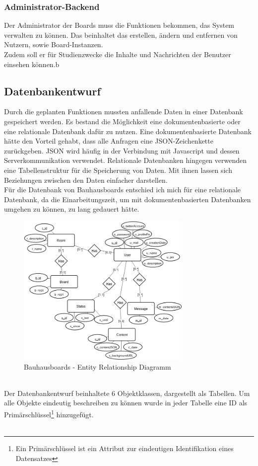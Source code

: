 \subsubsection{Administrator-Backend}\label{Administrator-Backend}
Der Administrator der Boards muss die Funktionen bekommen, das System verwalten zu können. Das beinhaltet das erstellen, ändern und entfernen von Nutzern, sowie Board-Instanzen.
\\
Zudem soll er für Studienzwecke die Inhalte und Nachrichten der Benutzer einsehen können.b

\subsection{Datenbankentwurf}\label{Datenbankentwurf}
Durch die geplanten Funktionen mussten anfallende Daten in einer Datenbank gespeichert werden.
Es bestand die Möglichkeit eine dokumentenbasierte oder eine relationale Datenbank dafür zu nutzen.
Eine dokumentenbasierte Datenbank hätte den Vorteil gehabt, dass alle Anfragen eine JSON-Zeichenkette zurückgeben. JSON wird häufig in der Verbindung mit Javascript und dessen Serverkommunikation verwendet.
Relationale Datenbanken hingegen verwenden eine Tabellenstruktur für die Speicherung von Daten. Mit ihnen lassen sich Beziehungen zwischen den Daten einfacher darstellen.
\\
Für die Datenbank von Bauhausboards entschied ich mich für eine relationale Datenbank, da die Einarbeitungszeit, um mit dokumentenbasierten Datenbanken umgehen zu können, zu lang gedauert hätte.
\begin{figure}[h!]
  \centering
    \includegraphics[width=0.75\textwidth]{./img/ER01.png}
  \caption{Bauhausboards - Entity Relationship Diagramm}
  \label{img:ER01}
\end{figure}
\\
Der Datenbankentwurf beinhaltete 6 Objektklassen, dargestellt als Tabellen. Um alle Objekte eindeutig beschreiben zu können wurde in jeder Tabelle eine ID als Primärschlüssel\footnote{Ein Primärschlüssel ist ein Attribut zur eindeutigen Identifikation eines Datensatzes} hinzugefügt.
\\\\
